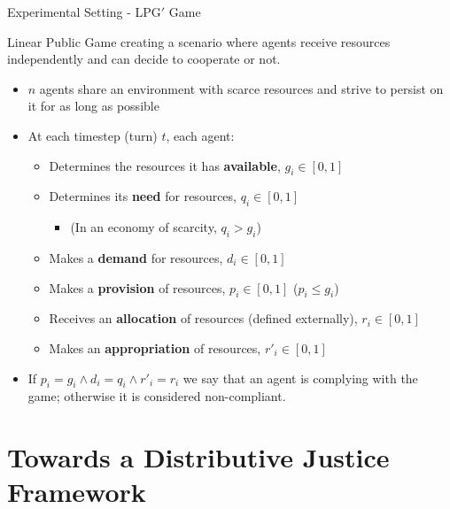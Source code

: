 \begin{frame}{Experimental Setting - LPG\('\) Game}

\begin{block}{}
Linear Public Game creating a scenario where agents receive resources independently and can decide to cooperate or not.
\end{block}

\begin{itemize}
\tightlist
\item
  \(n\) agents share an environment with scarce resources and strive to
  persist on it for as long as possible
\item
  At each timestep (turn) \(t\), each agent:

  \begin{itemize}
  \tightlist
  \item
    Determines the resources it has \textbf{available},
    \(g_i \in [0,1]\)
  \item
    Determines its \textbf{need} for resources, \(q_i \in [0,1]\)

    \begin{itemize}
    \tightlist
    \item
      (In an economy of scarcity, \(q_i > g_i\))
    \end{itemize}
  \item
    Makes a \textbf{demand} for resources, \(d_i \in [0,1]\)
  \item
    Makes a \textbf{provision} of resources, \(p_i \in [0,1]\)
    (\(p_i \leq g_i\))
  \item
    Receives an \textbf{allocation} of resources (defined externally),
    \(r_i \in [0,1]\)
  \item
    Makes an \textbf{appropriation} of resources, \(r'_i \in [0,1]\)
  \end{itemize}
\item
  If \(p_i = g_i \land d_i = q_i \land r'_i = r_i\) we say that an agent
  is complying with the game; otherwise it is considered non-compliant.
\end{itemize}

\end{frame}

\section{Towards a Distributive Justice
Framework}\label{towards-a-distributive-justice-framework}

